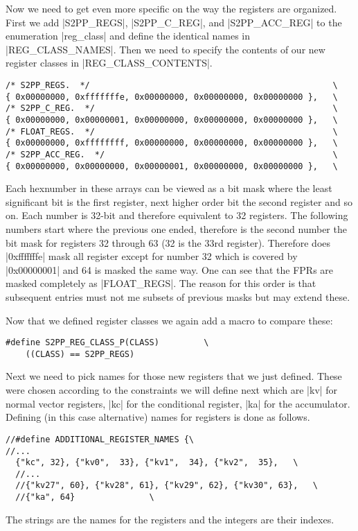 Now we need to get even more specific on the way the registers are organized.
First we add |S2PP_REGS|, |S2PP_C_REG|, and |S2PP_ACC_REG| to the enumeration |reg_class| and define the identical names in |REG_CLASS_NAMES|.
Then we need to specify the contents of our new register classes in |REG_CLASS_CONTENTS|.
\begin{lstlisting}
/* S2PP_REGS.  */                                                 \
{ 0x00000000, 0xfffffffe, 0x00000000, 0x00000000, 0x00000000 },   \
/* S2PP_C_REG.  */                                                \
{ 0x00000000, 0x00000001, 0x00000000, 0x00000000, 0x00000000 },   \
/* FLOAT_REGS.  */                                                \
{ 0x00000000, 0xffffffff, 0x00000000, 0x00000000, 0x00000000 },   \
/* S2PP_ACC_REG.  */                                              \
{ 0x00000000, 0x00000000, 0x00000001, 0x00000000, 0x00000000 },   \
\end{lstlisting}
Each hexnumber in these arrays can be viewed as a bit mask where the least significant bit is the first register, next higher order bit the second register and so on.
Each number is 32-bit and therefore equivalent to 32 registers.
The following numbers start where the previous one ended, therefore is the second number the bit mask for registers 32 through 63 (32 is the 33rd register).
Therefore does |0xfffffffe| mask all register except for number 32 which is covered by |0x00000001| and 64 is masked the same way.
One can see that the FPRs are masked completely as |FLOAT_REGS|.
The reason for this order is that subsequent entries must not me subsets of previous masks but may extend these.

Now that we defined register classes we again add a macro to compare these:
\begin{lstlisting}
#define S2PP_REG_CLASS_P(CLASS)         \
    ((CLASS) == S2PP_REGS)
\end{lstlisting}
 \todo{unnecessary}
Next we need to pick names for those new registers that we just defined.
These were chosen according to the constraints we will define next which are |kv| for normal vector registers, |kc| for the conditional register, |ka| for the accumulator.
Defining (in this case alternative) names for registers is done as follows.
\begin{lstlisting}
//#define ADDITIONAL_REGISTER_NAMES {\
//...
  {"kc", 32}, {"kv0",  33}, {"kv1",  34}, {"kv2",  35},   \
  //...
  //{"kv27", 60}, {"kv28", 61}, {"kv29", 62}, {"kv30", 63},   \
  //{"ka", 64}               \
\end{lstlisting}
The strings are the names for the registers and the integers are their indexes.

